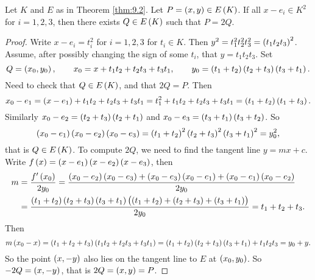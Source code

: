 \begin{lemma}
\label{lem:9.3}
Let $ K $ and $ E $ as in Theorem \ref{thm:9.2}. Let $ P = \br{x, y} \in E\br{K} $. If all $ x - e_i \in K^2 $ for $ i = 1, 2, 3 $, then there exists $ Q \in E\br{K} $ such that $ P = 2Q $.
\end{lemma}

\begin{proof}
Write $ x - e_i = t_i^2 $ for $ i = 1, 2, 3 $ for $ t_i \in K $. Then $ y^2 = t_1^2t_2^2t_3^2 = \br{t_1t_2t_3}^2 $. Assume, after possibly changing the sign of some $ t_i $, that $ y = t_1t_2t_3 $. Set
$$ Q = \br{x_0, y_0}, \qquad x_0 = x + t_1t_2 + t_2t_3 + t_3t_1, \qquad y_0 = \br{t_1 + t_2}\br{t_2 + t_3}\br{t_3 + t_1}. $$
Need to check that $ Q \in E\br{K} $, and that $ 2Q = P $. Then
$$ x_0 - e_1 = \br{x - e_1} + t_1t_2 + t_2t_3 + t_3t_1 = t_1^2 + t_1t_2 + t_2t_3 + t_3t_1 = \br{t_1 + t_2}\br{t_1 + t_3}. $$
Similarly $ x_0 - e_2 = \br{t_2 + t_3}\br{t_2 + t_1} $ and $ x_0 - e_3 = \br{t_3 + t_1}\br{t_3 + t_2} $. So
$$ \br{x_0 - e_1}\br{x_0 - e_2}\br{x_0 - e_3} = \br{t_1 + t_2}^2\br{t_2 + t_3}^2\br{t_3 + t_1}^2 = y_0^2, $$
that is $ Q \in E\br{K} $. To compute $ 2Q $, we need to find the tangent line $ y = mx + c $. Write $ f\br{x} = \br{x - e_1}\br{x - e_2}\br{x - e_3} $, then
\begin{align*}
m
& = \dfrac{f'\br{x_0}}{2y_0}
= \dfrac{\br{x_0 - e_2}\br{x_0 - e_3} + \br{x_0 - e_3}\br{x_0 - e_1} + \br{x_0 - e_1}\br{x_0 - e_2}}{2y_0} \\
& = \dfrac{\br{t_1 + t_2}\br{t_2 + t_3}\br{t_3 + t_1}\br{\br{t_1 + t_2} + \br{t_2 + t_3} + \br{t_3 + t_1}}}{2y_0}
= t_1 + t_2 + t_3.
\end{align*}
Then
$$ m\br{x_0 - x} = \br{t_1 + t_2 + t_3}\br{t_1t_2 + t_2t_3 + t_3t_1} = \br{t_1 + t_2}\br{t_2 + t_3}\br{t_3 + t_1} + t_1t_2t_3 = y_0 + y. $$
So the point $ \br{x, -y} $ also lies on the tangent line to $ E $ at $ \br{x_0, y_0} $. So $ -2Q = \br{x, -y} $, that is $ 2Q = \br{x, y} = P $.
\end{proof}


